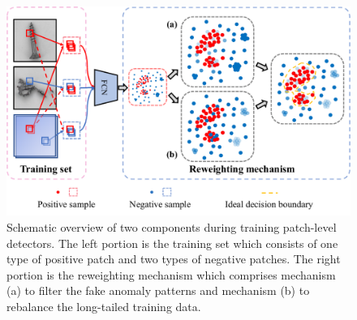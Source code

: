 \documentclass[letterpaper]{article} %
\begin{document}
\begin{figure}[!t]
\centering
    \includegraphics[width=1\linewidth]{images/training_detector.pdf}
    \caption{Schematic overview of two components during training patch-level detectors. The left portion is the training set which consists of one type of positive patch and two types of negative patches. The right portion is the reweighting mechanism which comprises mechanism (a) to filter the fake anomaly patterns and mechanism (b) to rebalance the long-tailed training data.}
    \label{fig: detector}
\end{figure}
\end{document}
